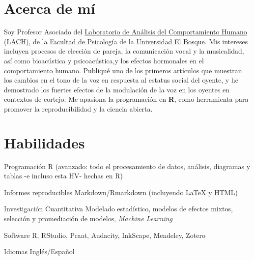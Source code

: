 \documentclass[11pt,a4paper,]{awesome-cv}
\begin{document}
\makecvheader






\hypertarget{acerca-de-muxed}{%
\section{Acerca de mí}\label{acerca-de-muxed}}

Soy Profesor Asociado del
\href{https://www.psicologia.unbosque.edu.co/lach}{Laboratorio de
Análisis del Comportamiento Humano (LACH)}, de la
\href{https://www.uelbosque.edu.co/psicologia}{Facultad de Psicología}
de la \href{https://www.uelbosque.edu.co/}{Universidad El Bosque}. Mis
intereses incluyen procesos de elección de pareja, la comunicación vocal
y la musicalidad, así como bioacústica y psicoacústica,y los efectos
hormonales en el comportamiento humano. Publiqué uno de los primeros
artículos que muestran los cambios en el tono de la voz en respuesta al
estatus social del oyente, y he demostrado los fuertes efectos de la
modulación de la voz en los oyentes en contextos de cortejo. Me apasiona
la programación en \textbf{R}, como herramienta para promover la
reproducibilidad y la ciencia abierta.

\hypertarget{habilidades}{%
\section{Habilidades}\label{habilidades}}

\begin{cvskills}
  \cvskill
    {Programación}
    {R (avanzado: todo el procesamiento de datos, análisis, diagramas y tablas -e incluso esta HV- hechas en R)}

  \cvskill
    {Informes reproducibles}
    {Markdown/Rmarkdown (incluyendo {\selectfont\LaTeX} y HTML)}

  \cvskill
    {Investigación Cuantitativa}
    {Modelado estadístico, modelos de efectos mixtos, selección y promediación de modelos, \textit{Machine Learning}}

  \cvskill
    {Software}
    {R, RStudio, Praat, Audacity, InkScape, Mendeley, Zotero}

  \cvskill
    {Idiomas}
    {Inglés/Español}
\end{cvskills}
\end{document}
